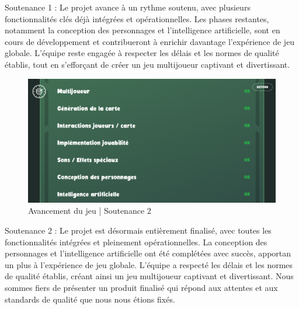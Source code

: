 \documentclass[
	article,			%
	11pt,				%
	oneside,			%
	a4paper,			%
	chapter=TITLE,
	french,			%
	sumario=tradicional
	]{base_nt}
\begin{document}
Soutenance 1 : Le projet avance à un rythme soutenu, avec plusieurs fonctionnalités clés déjà intégrées et opérationnelles. Les phases restantes, notamment la conception des personnages et l'intelligence artificielle, sont en cours de développement et contribueront à enrichir davantage l'expérience de jeu globale. L'équipe reste engagée à respecter les délais et les normes de qualité établis, tout en s'efforçant de créer un jeu multijoueur captivant et divertissant.

\vspace{0cm}
\begin{figure}[ht]
	\caption{Avancement du jeu | Soutenance 2}
	\centering
	\includegraphics[width=1\linewidth]{paper8.png}
	
\end{figure}

Soutenance 2 : Le projet est désormais entièrement finalisé, avec toutes les fonctionnalités intégrées et pleinement opérationnelles. La conception des personnages et l'intelligence artificielle ont été complétées avec succès, apportan un plus à l'expérience de jeu globale. L'équipe a respecté les délais et les normes de qualité établis, créant ainsi un jeu multijoueur captivant et divertissant. Nous sommes fiers de présenter un produit finalisé qui répond aux attentes et aux standards de qualité que nous nous étions fixés.

\textual

\newpage

\customtableofcontents

\newpage
\end{document}
